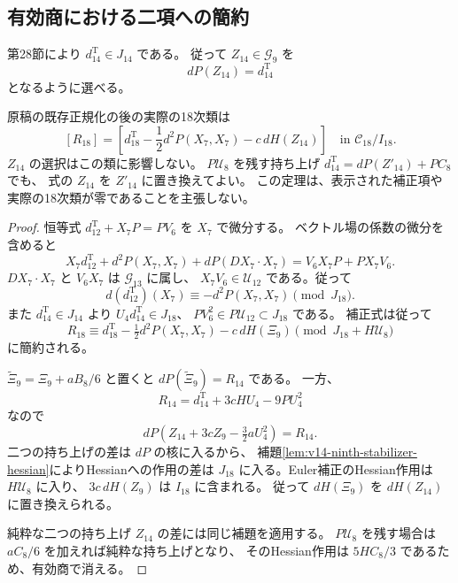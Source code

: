 \subsection{有効商における二項への簡約}

第28節により $d^{\mathrm T}_{14}\in J_{14}$ である。
従って $Z_{14}\in\mathcal G_9$ を
\[
 dP(Z_{14})=d^{\mathrm T}_{14}
\]
となるように選べる。

\begin{theorem}[実際の十八次類の計算に十分な代表元]
\label{thm:v14-eighteenth-effective-representative}
原稿の既存正規化の後の実際の18次類は
\begin{equation}\label{eq:v14-eighteen-effective-representative}
 \boxed{\displaystyle
 [R_{18}]=\left[
 d^{\mathrm T}_{18}-\frac12d^2P(X_7,X_7)-c\,dH(Z_{14})
 \right]\quad\text{in }\mathcal C_{18}/I_{18}.
 }
\end{equation}
$Z_{14}$ の選択はこの類に影響しない。
$P\mathcal U_8$ を残す持ち上げ
$d^{\mathrm T}_{14}=dP(Z'_{14})+PC_8$ でも、
式の $Z_{14}$ を $Z'_{14}$ に置き換えてよい。
この定理は、表示された補正項や実際の18次類が零であることを主張しない。
\end{theorem}

\begin{proof}
恒等式 $d^{\mathrm T}_{12}+X_7P=PV_6$ を $X_7$ で微分する。
ベクトル場の係数の微分を含めると
\[
 X_7d^{\mathrm T}_{12}+d^2P(X_7,X_7)
       +dP(DX_7\cdot X_7)
 =V_6X_7P+P X_7V_6.
\]
$DX_7\cdot X_7$ と $V_6X_7$ は $\mathcal G_{13}$ に属し、
$X_7V_6\in\mathcal U_{12}$ である。従って
\[
 d(d^{\mathrm T}_{12})(X_7)
    \equiv-d^2P(X_7,X_7)\pmod{J_{18}}.
\]
また $d^{\mathrm T}_{14}\in J_{14}$ より
$U_4d^{\mathrm T}_{14}\in J_{18}$、
$PV_6^2\in P\mathcal U_{12}\subset J_{18}$ である。
補正式は従って
\[
 R_{18}\equiv d^{\mathrm T}_{18}-\tfrac12d^2P(X_7,X_7)
                       -c\,dH(\Xi_9)\pmod{J_{18}+H\mathcal U_8}
\]
に簡約される。

$\widetilde\Xi_9=\Xi_9+aB_8/6$ と置くと
$dP(\widetilde\Xi_9)=R_{14}$ である。
一方、
\[
 R_{14}=d^{\mathrm T}_{14}+3cHU_4-9PU_4^2
\]
なので
\[
 dP\left(Z_{14}+3cZ_9-\tfrac32aU_4^2\right)=R_{14}.
\]
二つの持ち上げの差は $dP$ の核に入るから、
補題\ref{lem:v14-ninth-stabilizer-hessian}によりHessianへの作用の差は
$J_{18}$ に入る。Euler補正のHessian作用は $H\mathcal U_8$ に入り、
$3c\,dH(Z_9)$ は $I_{18}$ に含まれる。
従って $dH(\Xi_9)$ を $dH(Z_{14})$ に置き換えられる。

純粋な二つの持ち上げ $Z_{14}$ の差には同じ補題を適用する。
$P\mathcal U_8$ を残す場合は $aC_8/6$ を加えれば純粋な持ち上げとなり、
そのHessian作用は $5HC_8/3$ であるため、有効商で消える。
\end{proof}

